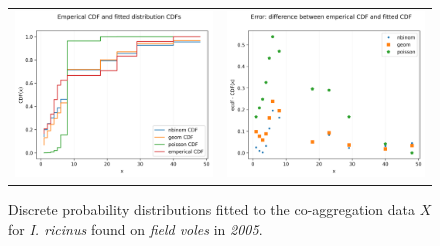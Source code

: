 \documentclass{article}
\begin{document}
\begin{figure}[h!]
	\centering
	\begin{tabular}{ll}
		\includegraphics[width=.48\linewidth,valign=m]{CDF_compare_2005_I.ricinus_FV} & \includegraphics[width=.48\linewidth,valign=m]{CDF_errors_2005_I.ricinus_FV}
	\end{tabular}
	\caption{Discrete probability distributions fitted to the co-aggregation data $ X $ for \textit{I. ricinus} found on \textit{field voles} in \textit{2005}.}
	\label{fig:kielder_2005_iricnus_FV}
\end{figure}
\end{document}
